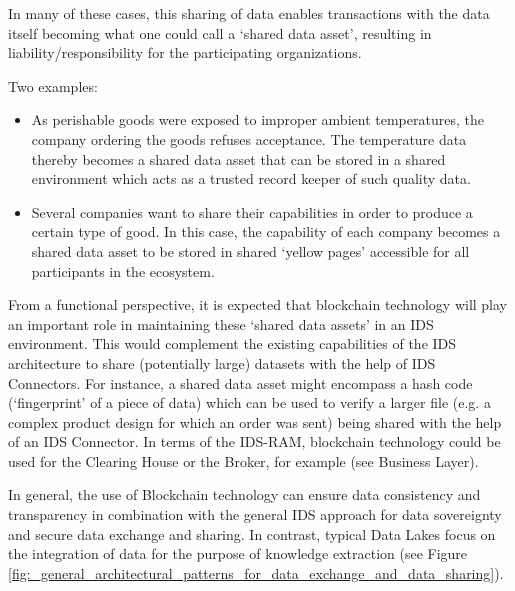 In many of these cases, this sharing of data enables transactions with the data itself becoming what one could call a ‘shared data asset’, resulting in liability/responsibility for the participating organizations. 

Two examples: 

\begin{itemize}
	\item As perishable goods were exposed to improper ambient temperatures, the company ordering the goods refuses acceptance. The temperature data thereby becomes a shared data asset that can be stored in a shared environment which acts as a trusted record keeper of such quality data. 

	\item Several companies want to share their capabilities in order to produce a certain type of good. In this case, the capability of each company becomes a shared data asset to be stored in shared ‘yellow pages’ accessible for all participants in the ecosystem. 
\end{itemize}

From a functional perspective, it is expected that blockchain technology will play an important role in maintaining these ‘shared data assets’ in an IDS environment. This would complement the existing capabilities of the IDS architecture to share (potentially large) datasets with the help of IDS Connectors. For instance, a shared data asset might encompass a hash code (‘fingerprint’ of a piece of data) which can be used to verify a larger file (e.g. a complex product design for which an order was sent) being shared with the help of an IDS Connector. In terms of the IDS-RAM, blockchain technology could be used for the Clearing House or the Broker, for example (see Business Layer).

In general, the use of Blockchain technology can ensure data consistency and transparency in combination with the general IDS approach for data sovereignty and secure data exchange and sharing. In contrast, typical Data Lakes focus on the integration of data for the purpose of knowledge extraction (see Figure \ref{fig:_general_architectural_patterns_for_data_exchange_and_data_sharing}).




